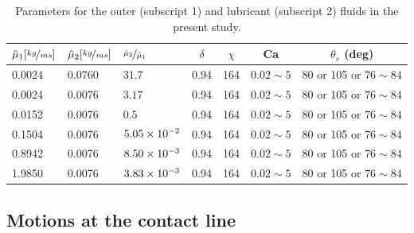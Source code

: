 \begin{table}[t]
  \footnotesize
  \centering
  \caption{Parameters for the outer (subscript 1) and lubricant (subscript 2) fluids in the present study.}
  \bgroup
  \def\arraystretch{1.05} %
  {\setlength{\tabcolsep}{0.9em} %
  \begin{tabular}{l l l c c c c}
    \hline
    $\tilde{\mu}_1 [\nicefrac{kg}{ms}]$ 
    &$\tilde{\mu}_2 [\nicefrac{kg}{ms}]$ 
    &$\nicefrac{\tilde{\mu}_2}{\tilde{\mu}_1}$ 
    &$\delta$
    &$\chi$
    &Ca
    &$\theta_s$ (deg)\\
    \hline
    0.0024 &0.0760 &$31.7$        &0.94  &164 &$0.02 \sim 5$  &80 or 105 or $76 \sim 84$\\
    0.0024 &0.0076 &$3.17$        &0.94  &164 &$0.02 \sim 5$  &80 or 105 or $76 \sim 84$\\
    0.0152 &0.0076 &$0.5$         &0.94  &164 &$0.02 \sim 5$  &80 or 105 or $76 \sim 84$\\
    0.1504 &0.0076 &$5.05\times 10^{-2}$  &0.94  &164 &$0.02 \sim 5$  &80 or 105 or $76 \sim 84$\\
    0.8942 &0.0076 &$8.50\times 10^{-3}$  &0.94  &164 &$0.02 \sim 5$  &80 or 105 or $76 \sim 84$\\
    1.9850 &0.0076 &$3.83\times 10^{-3}$  &0.94  &164 &$0.02 \sim 5$  &80 or 105 or $76 \sim 84$\\
    \hline
  \end{tabular}}
  \egroup
  \label{tab: param}
\end{table}

\subsection{Motions at the contact line}

%

